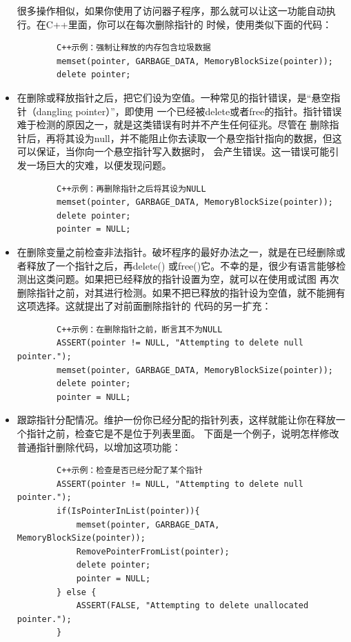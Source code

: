 \documentclass{article}
\begin{document}
\begin{itemize}
    很多操作相似，如果你使用了访问器子程序，那么就可以让这一功能自动执行。在C++里面，你可以在每次删除指针的
    时候，使用类似下面的代码：
    \begin{lstlisting}
        C++示例：强制让释放的内存包含垃圾数据
        memset(pointer, GARBAGE_DATA, MemoryBlockSize(pointer));
        delete pointer;
    \end{lstlisting}
    \item 在删除或释放指针之后，把它们设为空值。一种常见的指针错误，是“悬空指针（dangling pointer）”，即使用
    一个已经被delete或者free的指针。指针错误难于检测的原因之一，就是这类错误有时并不产生任何征兆。尽管在
    删除指针后，再将其设为null，并不能阻止你去读取一个悬空指针指向的数据，但这可以保证，当你向一个悬空指针写入数据时，
    会产生错误。这一错误可能引发一场巨大的灾难，以便发现问题。
    \begin{lstlisting}
        C++示例：再删除指针之后将其设为NULL
        memset(pointer, GARBAGE_DATA, MemoryBlockSize(pointer));
        delete pointer;
        pointer = NULL;
    \end{lstlisting}
    \item 在删除变量之前检查非法指针。破坏程序的最好办法之一，就是在已经删除或者释放了一个指针之后，再delete()
    或free()它。不幸的是，很少有语言能够检测出这类问题。如果把已经释放的指针设置为空，就可以在使用或试图
    再次删除指针之前，对其进行检测。如果不把已释放的指针设为空值，就不能拥有这项选择。这就提出了对前面删除指针的
    代码的另一扩充：
    \begin{lstlisting}
        C++示例：在删除指针之前，断言其不为NULL
        ASSERT(pointer != NULL, "Attempting to delete null pointer.");
        memset(pointer, GARBAGE_DATA, MemoryBlockSize(pointer));
        delete pointer;
        pointer = NULL;
    \end{lstlisting}
    \item 跟踪指针分配情况。维护一份你已经分配的指针列表，这样就能让你在释放一个指针之前，检查它是不是位于列表里面。
    下面是一个例子，说明怎样修改普通指针删除代码，以增加这项功能：
    \begin{lstlisting}
        C++示例：检查是否已经分配了某个指针
        ASSERT(pointer != NULL, "Attempting to delete null pointer.");
        if(IsPointerInList(pointer)){
            memset(pointer, GARBAGE_DATA, MemoryBlockSize(pointer));
            RemovePointerFromList(pointer);
            delete pointer;
            pointer = NULL;
        } else {
            ASSERT(FALSE, "Attempting to delete unallocated pointer.");
        }
    \end{lstlisting}

\end{itemize}
\end{document}
